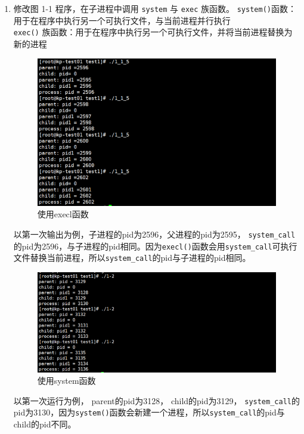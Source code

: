 \documentclass{article}
\begin{document}
\begin{enumerate}
        \item 修改图 1-1 程序，在子进程中调用 \texttt{system} 与 \texttt{exec} 族函数。
        \texttt{system()}函数：用于在程序中执行另一个可执行文件，与当前进程并行执行\\
        \texttt{exec()} 族函数：用于在程序中执行另一个可执行文件，并将当前进程替换为新的进程
        \begin{figure}[htbp]
            \centering
            \includegraphics[scale=0.5]{picture/6.png}
            \caption{使用execl函数}
            \label{6}
        \end{figure} 
        以第一次输出为例，子进程的pid为2596，父进程的pid为2595， \texttt{system\_call}的pid为2596，与子进程的pid相同。因为\texttt{execl()}函数会用\texttt{system\_call}可执行文件替换当前进程，所以\texttt{system\_call}的pid与子进程的pid相同。
        \begin{figure}[htbp]
            \centering
            \includegraphics[scale=0.5]{picture/7.png}
            \caption{使用system函数}
            \label{7}
        \end{figure}
        以第一次运行为例， parent的pid为3128， child的pid为3129， \texttt{system\_call}的pid为3130，因为\texttt{system()}函数会新建一个进程，所以\texttt{system\_call}的pid与child的pid不同。
    \end{enumerate}
\end{document}

